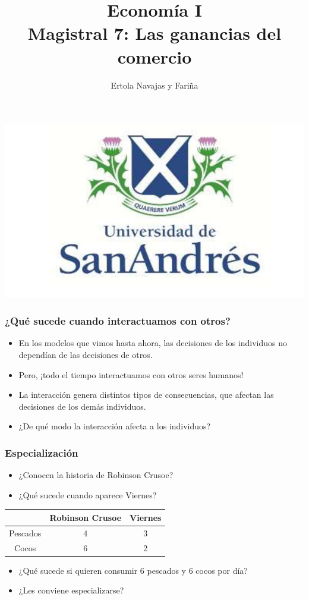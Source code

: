 \documentclass{beamer}
\title[Economía I]{Economía I \vspace{4mm}
\\ Magistral 7: Las ganancias del comercio}
\date{}
\author[Ertola Navajas y Fariña]{Ertola Navajas y Fariña}
\institute[]{Universidad de San Andrés}
\begin{document}
\begin{frame}
\titlepage
\centering
\includegraphics[scale=0.2]{Slides Principios de Economia/Figures/logoUDESA.jpg} 
\end{frame}


\begin{frame}
\frametitle{¿Qué sucede cuando interactuamos con otros?}
\begin{itemize}
    \item En los modelos que vimos hasta ahora, las decisiones de los individuos no dependían de las decisiones de otros.
    \item Pero, ¡todo el tiempo interactuamos con otros seres humanos!
    \item La interacción genera distintos tipos de consecuencias, que afectan las decisiones de los demás individuos.
    \item ¿De qué modo la interacción afecta a los individuos? 
\end{itemize} 
\end{frame}

\begin{frame}
\frametitle{Especialización}
    \begin{itemize}
    \item ¿Conocen la historia de Robinson Crusoe?
    \item ¿Qué sucede cuando aparece Viernes?  
    \end{itemize}
    \centering \vspace{4mm}
    \begin{tabular}{|c|c|c|} \hline
        & Robinson Crusoe & Viernes \\ \hline
     Pescados   & 4 & 3 \\ \hline
     Cocos   & 6 & 2 \\ \hline     \end{tabular}
    \begin{itemize}\vspace{4mm}
    \item ¿Qué sucede si quieren consumir 6 pescados y 6 cocos por día? 
    \item ¿Les conviene especializarse?  
    \end{itemize}
\end{frame}
\end{document}
